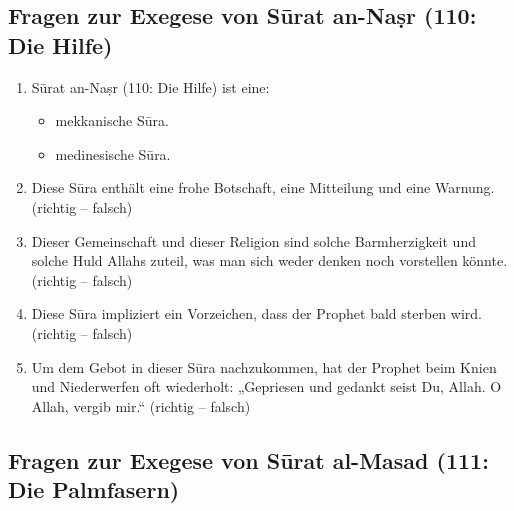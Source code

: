 \subsection*{Fragen zur Exegese von Sūrat an-Naṣr (110: Die Hilfe)}

\begin{enumerate}[leftmargin=1.6em,resume]
\item Sūrat an-Naṣr (110: Die Hilfe) ist eine:
  \begin{itemize}
    \item mekkanische Sūra. \item medinesische Sūra.
  \end{itemize}
\item Diese Sūra enthält eine frohe Botschaft, eine Mitteilung und eine Warnung.
  (richtig -- falsch)
\item Dieser Gemeinschaft und dieser Religion sind solche Barmherzigkeit und solche Huld
  Allahs zuteil, was man sich weder denken noch vorstellen könnte. (richtig -- falsch)
\item Diese Sūra impliziert ein Vorzeichen, dass der Prophet  bald sterben wird.
  (richtig -- falsch)
\item Um dem Gebot in dieser Sūra nachzukommen, hat der Prophet  beim Knien und
  Niederwerfen oft wiederholt: „Gepriesen und gedankt seist Du, Allah. O Allah, vergib mir.“
  (richtig -- falsch)
\end{enumerate}

\subsection*{Fragen zur Exegese von Sūrat al-Masad (111: Die Palmfasern)}

